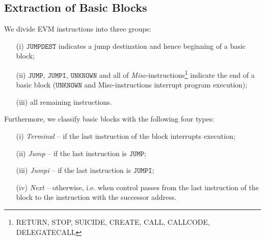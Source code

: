 \documentclass[sigplan,10pt,review]{acmart}\settopmatter{printfolios=true,printccs=false,printacmref=false}
\newcommand{\instr}[1]{\mathtt{#1}}
\begin{document}
\subsection{Extraction of Basic Blocks}
\label{sec:extract}
%
We divide EVM instructions into three groups:
\begin{itemize}
\item[(i)] $\instr{JUMPDEST}$ indicates a jump destination and hence beginning of a
                                 basic block;
\item[(ii)] $\instr{JUMP}$, $\instr{JUMPI}$, $\instr{UNKNOWN}$ and all of 
            \emph{Misc}-instructions\footnote{RETURN, STOP, SUICIDE, CREATE, CALL, CALLCODE, DELEGATECALL}
            indicate the end of a basic block ($\instr{UNKNOWN}$ and Misc-instructions interrupt program execution); 
\item[(iii)] all remaining instructions. %
\end{itemize}  
Furthermore, we classify basic blocks with the following four types:
\begin{itemize}
\item[(i)] \textit{Terminal} -- if the last instruction of the block interrupts execution;
\item[(ii)] \textit{Jump} -- if the last instruction is $\instr{JUMP}$;
\item[(iii)] \textit{Jumpi} -- if the last instruction is $\instr{JUMPI}$;
\item[(iv)] \textit{Next} -- otherwise, i.e. when control passes from the last instruction of the block
                             to the instruction with the successor address.                         
\end{itemize} 
\end{document}
